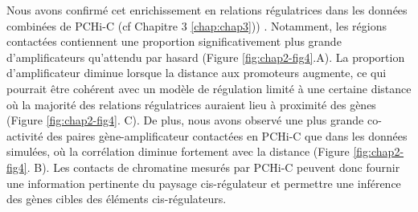 Nous avons confirmé cet enrichissement en relations régulatrices dans les données combinées de \gls{PCHi-C} (cf Chapitre 3 \ref{chap:chap3})) \citep{laverre_long-range_2022}. Notamment, les régions contactées contiennent une proportion significativement plus grande d’amplificateurs qu’attendu par hasard (Figure \ref{fig:chap2-fig4}.A). La proportion d’amplificateur diminue lorsque la distance aux promoteurs augmente, ce qui pourrait être cohérent avec un modèle de régulation limité à une certaine distance où la majorité des relations régulatrices auraient lieu à proximité des gènes (Figure \ref{fig:chap2-fig4}. C). De plus, nous avons observé une plus grande co-activité des paires gène-amplificateur contactées en \gls{PCHi-C} que dans les données simulées, où la corrélation diminue fortement avec la distance (Figure \ref{fig:chap2-fig4}. B). Les contacts de chromatine mesurés par \gls{PCHi-C} peuvent donc fournir une information pertinente du paysage \gls{cis}-régulateur et permettre une inférence des gènes cibles des éléments \gls{cis}-régulateurs.

